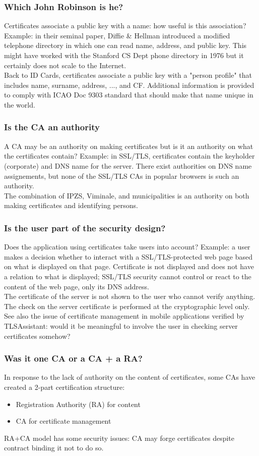 \documentclass[a4paper, 10pt, titlepage]{article}
\begin{document}
\begin{footnotesize}
\subsubsection*{Which John Robinson is he?}
Certificates associate a public key with a name: how useful is this association? Example: in their seminal paper, %
Diffie \& Hellman introduced a modified telephone directory in which one can read name, address, and public key. This might have worked with the Stanford CS Dept phone directory in 1976 but it certainly does not scale to the Internet.\medskip\\
Back to ID Cards, certificates associate a public key with a "person profile" that includes name, surname, address, ..., and CF. Additional information is provided to comply with ICAO Doc 9303 standard that should make that name unique in the world.
\subsubsection*{Is the CA an authority}
A CA may be an authority on making certificates but is it an authority on what the certificates contain? Example: in SSL/TLS, certificates contain the keyholder (corporate) and DNS name for the server. There exist authorities on DNS name assignements, but none of the SSL/TLS CAs in popular browsers is such an authority. \medskip\\
The combination of IPZS, Viminale, and municipalities is an authority on both making certificates and identifying persons.
\subsubsection*{Is the user part of the security design?}
Does the application using certificates take users into account?
Example: a user makes a decision whether to interact with a SSL/TLS-protected web page based on what is displayed on that page. Certificate is not displayed and does not have a relation to what is displayed; SSL/TLS security cannot control or react to the content of the web page, only its DNS address.\medskip\\
The certificate of the server is not shown to the user who cannot verify anything. The check on the server certificate is performed at the cryptographic level only. See also the issue of certificate
management in mobile applications verified by TLSAssistant: would it be meaningful to involve the user in checking server certificates somehow?
\subsubsection*{Was it one CA or a CA + a RA?}
In response to the lack of authority on the content of certificates, some CAs have created a 2-part certification structure:
\begin{itemize}
\item Registration Authority (RA) for content
\item CA for certificate management
\end{itemize}
RA+CA model has some security issues: CA may forge certificates despite contract binding it not to do so.

\end{footnotesize}
\end{document}
